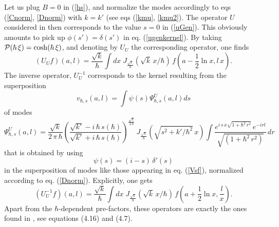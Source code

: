 \documentclass{article}
\newcommand{\re}[1]{(\ref{#1})}
\begin{document}
\noindent Let us plug  $B=0$ in \re{hs}, and normalize the modes accordingly to eqs (\ref{Cnorm}, \ref{Dnorm}) with $k=k'$ (see eqs (\ref{kmu}, \ref{kmu2}). The operator $U$ considered in  \cite{Unt,Unt2} then  corresponds to the value $s=0$  in \re{uGen}. This obviously amounts to pick up $\phi(s') = \delta (s')$ in eq. (\ref{ugenkernel}). By taking ${\cal P}(\hbar\,\xi)=\cosh (\hbar\,\xi)$, and denoting by $U_U$ the corresponding operator, one finds
\begin{equation}
 (U_{U} f) (a,l) = \frac{\sqrt{k}}{ \hbar} \int dx \; J_{\frac{\sqrt{k}}{\hbar}} ( {\sqrt{k}}\,x/\hbar) \, f(a-\frac{1}{2} \ln x,l\,x ).
\end{equation}
The inverse operator, $U^{-1}_U$ corresponds to the kernel resulting from the superposition
\begin{equation}
  v_{\hbar,s} (a,l) = \int \psi(s) \Psi_{\hbar,s}^{U}(a,l) ds
\end{equation}
of modes
\begin{equation}
 \Psi_{\hbar,s}^{U}(a,l) =\frac{\sqrt{k}}{ 2\,\pi\,\hbar}\left(\frac{\sqrt{k'}-i\,\hbar\,s(\hbar)}{\sqrt{k'}+i\,\hbar\,s(\hbar)}\right)^\frac {\sqrt{k}} {2\,\hbar}\, J_{\frac{\sqrt{k}}{\hbar}}(\sqrt{s^2 + k'/\hbar^2} \,x) \int    
 \frac{ e^{i \,s\, x \sqrt{1+\hbar^2\, r^2}} \, e^{- i r l}}{\sqrt{ (1+\hbar^2 \,r^2)}}\, dr 
 \end{equation}
that is obtained by using 
\begin{equation}
\psi(s)=(i-s)\,\delta'(s)
\end{equation}
in the superposition of modes like those appearing in eq. (\ref{Vsf}), normalized according to eq. (\ref{Dnorm}).
Explicitly,   one gets
\begin{equation}
 (U^{-1}_U f)(a,l) = \frac{\sqrt{k}}{ \hbar} \int dx \; J_{\frac{\sqrt{k}}{\hbar}} ({\sqrt{k}}\,x/\hbar) \, f(a+\frac{1}{2} \ln x ,\frac{  l}{x}).
\end{equation}
Apart from the $\hbar$-dependent pre-factors, these operators are exactly the ones found in \cite{Unt}, see equations (4.16) and (4.7).
\end{document}
